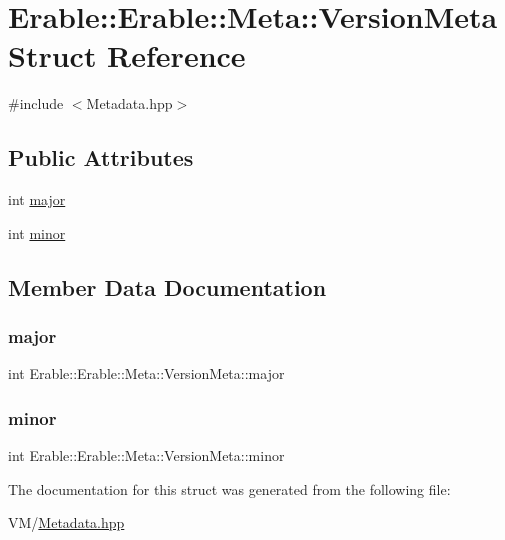 \hypertarget{struct_erable_1_1_erable_1_1_meta_1_1_version_meta}{}\section{Erable\+::Erable\+::Meta\+::Version\+Meta Struct Reference}
\label{struct_erable_1_1_erable_1_1_meta_1_1_version_meta}


{\ttfamily \#include $<$Metadata.\+hpp$>$}

\subsection*{Public Attributes}
\begin{DoxyCompactItemize}
\item 
int \mbox{\hyperlink{struct_erable_1_1_erable_1_1_meta_1_1_version_meta_a7295ed6eb241d786c7cf94b9886d3a38}{major}}
\item 
int \mbox{\hyperlink{struct_erable_1_1_erable_1_1_meta_1_1_version_meta_a408a0b0d5c003f48d1e4386e9e0bac5d}{minor}}
\end{DoxyCompactItemize}


\subsection{Member Data Documentation}
\mbox{\label{struct_erable_1_1_erable_1_1_meta_1_1_version_meta_a7295ed6eb241d786c7cf94b9886d3a38}} 
\subsubsection{\texorpdfstring{major}{major}}
{\footnotesize\ttfamily int Erable\+::\+Erable\+::\+Meta\+::\+Version\+Meta\+::major}

\mbox{\label{struct_erable_1_1_erable_1_1_meta_1_1_version_meta_a408a0b0d5c003f48d1e4386e9e0bac5d}} 
\subsubsection{\texorpdfstring{minor}{minor}}
{\footnotesize\ttfamily int Erable\+::\+Erable\+::\+Meta\+::\+Version\+Meta\+::minor}



The documentation for this struct was generated from the following file\+:\begin{DoxyCompactItemize}
\item 
V\+M/\mbox{\hyperlink{_metadata_8hpp}{Metadata.\+hpp}}\end{DoxyCompactItemize}
